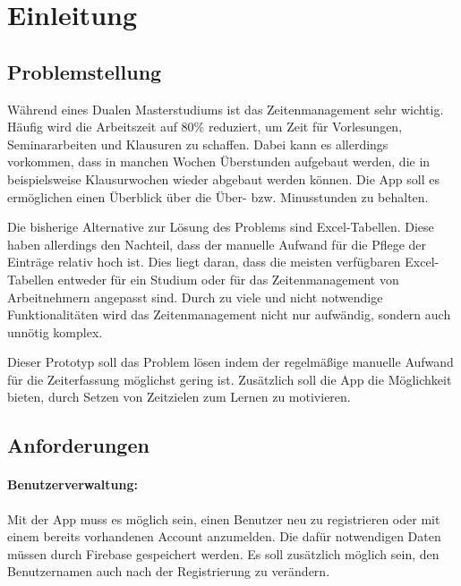 \section{Einleitung}\label{sec:einleitung}
\subsection{Problemstellung}
Während eines Dualen Masterstudiums ist das Zeitenmanagement sehr wichtig. Häufig wird die
Arbeitszeit auf 80\% reduziert, um Zeit für Vorlesungen, Seminararbeiten und Klausuren zu schaffen.
Dabei kann es allerdings vorkommen, dass in manchen Wochen Überstunden aufgebaut werden, die in beispielsweise
Klausurwochen wieder abgebaut werden können. Die App soll es ermöglichen einen Überblick über die
Über- bzw. Minusstunden zu behalten.

Die bisherige Alternative zur Lösung des Problems sind Excel-Tabellen.
Diese haben allerdings den Nachteil, dass der manuelle Aufwand für die Pflege der Einträge relativ hoch ist.
Dies liegt daran, dass die meisten verfügbaren Excel-Tabellen entweder für ein Studium oder für
das Zeitenmanagement von Arbeitnehmern angepasst sind. Durch zu viele und nicht notwendige Funktionalitäten
wird das Zeitenmanagement nicht nur aufwändig, sondern auch unnötig komplex.

Dieser Prototyp soll das Problem lösen indem der regelmäßige manuelle Aufwand für die Zeiterfassung
möglichst gering ist. Zusätzlich soll die App die Möglichkeit bieten,
durch Setzen von Zeitzielen zum Lernen zu motivieren.

\subsection{Anforderungen}
\paragraph{Benutzerverwaltung:}
Mit der App muss es möglich sein, einen Benutzer neu zu registrieren oder mit einem bereits
vorhandenen Account anzumelden.
Die dafür notwendigen Daten müssen durch Firebase gespeichert werden.
Es soll zusätzlich möglich sein, den Benutzernamen auch nach der Registrierung zu verändern.

\newpage

